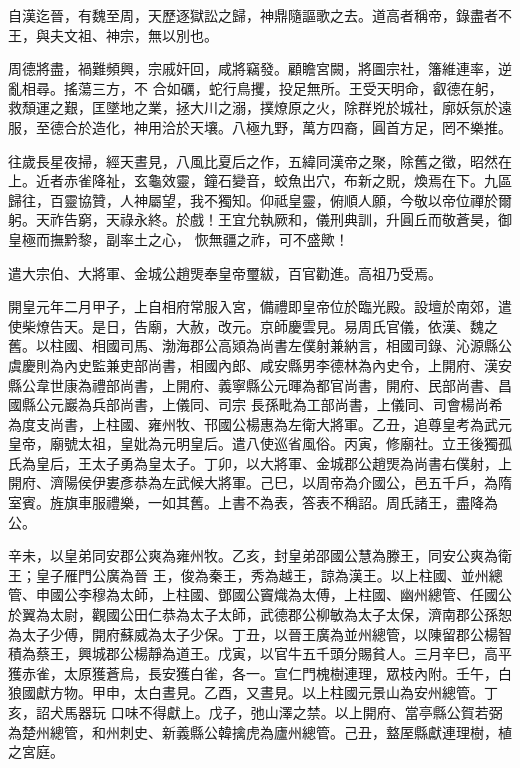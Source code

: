 \begin{pinyinscope}
 自漢迄晉，有魏至周，天歷逐獄訟之歸，神鼎隨謳歌之去。道高者稱帝，錄盡者不王，與夫文祖、神宗，無以別也。



 周德將盡，禍難頻興，宗戚奸回，咸將竊發。顧瞻宮闕，將圖宗社，籓維連率，逆亂相尋。搖蕩三方，不
 合如礪，蛇行鳥攫，投足無所。王受天明命，叡德在躬，救頹運之艱，匡墜地之業，拯大川之溺，撲燎原之火，除群兇於城社，廓妖氛於遠服，至德合於造化，神用洽於天壤。八極九野，萬方四裔，圓首方足，罔不樂推。



 往歲長星夜掃，經天晝見，八風比夏后之作，五緯同漢帝之聚，除舊之徵，昭然在上。近者赤雀降祉，玄龜效靈，鐘石變音，蛟魚出穴，布新之貺，煥焉在下。九區歸往，百靈協贊，人神屬望，我不獨知。仰祗皇靈，俯順人願，今敬以帝位禪於爾躬。天祚告窮，天祿永終。於戲！王宜允執厥和，儀刑典訓，升圓丘而敬蒼昊，御皇極而撫黔黎，副率土之心，
 恢無疆之祚，可不盛歟！



 遣大宗伯、大將軍、金城公趙煚奉皇帝璽紱，百官勸進。高祖乃受焉。



 開皇元年二月甲子，上自相府常服入宮，備禮即皇帝位於臨光殿。設壇於南郊，遣使柴燎告天。是日，告廟，大赦，改元。京師慶雲見。易周氏官儀，依漢、魏之舊。以柱國、相國司馬、渤海郡公高熲為尚書左僕射兼納言，相國司錄、沁源縣公虞慶則為內史監兼吏部尚書，相國內郎、咸安縣男李德林為內史令，上開府、漢安縣公韋世康為禮部尚書，上開府、義寧縣公元暉為都官尚書，開府、民部尚書、昌國縣公元巖為兵部尚書，上儀同、司宗
 長孫毗為工部尚書，上儀同、司會楊尚希為度支尚書，上柱國、雍州牧、邗國公楊惠為左衛大將軍。乙丑，追尊皇考為武元皇帝，廟號太祖，皇妣為元明皇后。遣八使巡省風俗。丙寅，修廟社。立王後獨孤氏為皇后，王太子勇為皇太子。丁卯，以大將軍、金城郡公趙煚為尚書右僕射，上開府、濟陽侯伊婁彥恭為左武候大將軍。己巳，以周帝為介國公，邑五千戶，為隋室賓。旌旗車服禮樂，一如其舊。上書不為表，答表不稱詔。周氏諸王，盡降為公。



 辛未，以皇弟同安郡公爽為雍州牧。乙亥，封皇弟邵國公慧為滕王，同安公爽為衛王；皇子雁門公廣為晉
 王，俊為秦王，秀為越王，諒為漢王。以上柱國、並州總管、申國公李穆為太師，上柱國、鄧國公竇熾為太傅，上柱國、幽州總管、任國公於翼為太尉，觀國公田仁恭為太子太師，武德郡公柳敏為太子太保，濟南郡公孫恕為太子少傅，開府蘇威為太子少保。丁丑，以晉王廣為並州總管，以陳留郡公楊智積為蔡王，興城郡公楊靜為道王。戊寅，以官牛五千頭分賜貧人。三月辛巳，高平獲赤雀，太原獲蒼烏，長安獲白雀，各一。宣仁門槐樹連理，眾枝內附。壬午，白狼國獻方物。甲申，太白晝見。乙酉，又晝見。以上柱國元景山為安州總管。丁亥，詔犬馬器玩
 口味不得獻上。戊子，弛山澤之禁。以上開府、當亭縣公賀若弼為楚州總管，和州刺史、新義縣公韓擒虎為廬州總管。己丑，盩厔縣獻連理樹，植之宮庭。




\end{pinyinscope}
